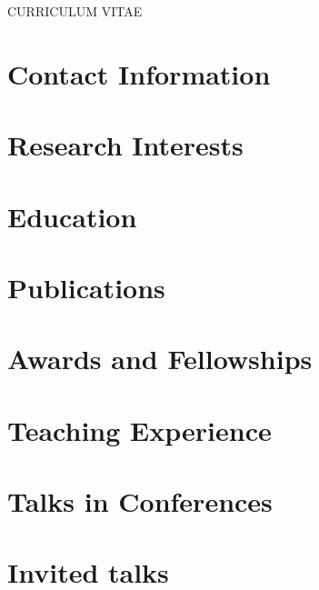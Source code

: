 \documentclass[margin,line]{res}
\begin{document}
\centerline{\Large CURRICULUM VITAE}


\begin{resume}
\section{\sc Contact Information}
    
\section{\sc Research Interests}
    
\section{\sc Education}
    
%     
\section{\sc Publications}
    
\section{\sc Awards and Fellowships}
    
%     
\section{\sc Teaching Experience}
    
%     
\section{\sc Talks in Conferences}
    
\section{\sc Invited talks}
    

\end{resume}
\end{document}
